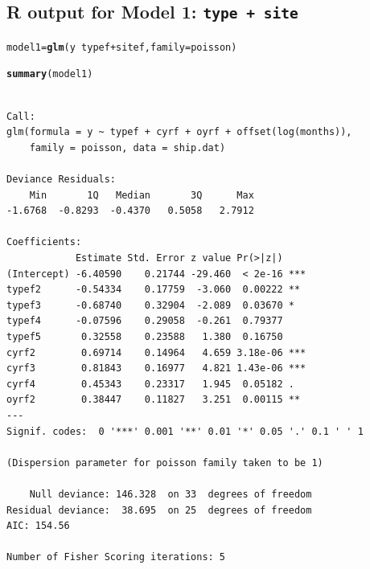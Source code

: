 \documentclass{article}\usepackage[]{graphicx}\usepackage[svgnames]{xcolor}
\makeatletter
\newcommand{\hlopt}[1]{\textcolor[rgb]{0,0,0}{#1}}%
\newcommand{\hlstd}[1]{\textcolor[rgb]{0.345,0.345,0.345}{#1}}%
\newcommand{\hlkwb}[1]{\textcolor[rgb]{0.69,0.353,0.396}{#1}}%
\newcommand{\hlkwc}[1]{\textcolor[rgb]{0.333,0.667,0.333}{#1}}%
\newcommand{\hlkwd}[1]{\textcolor[rgb]{0.737,0.353,0.396}{\textbf{#1}}}%
\newenvironment{kframe}{%
 \def\at@end@of@kframe{}%
 \ifinner\ifhmode%
  \def\at@end@of@kframe{\end{minipage}}%
  \begin{minipage}{\columnwidth}%
 \fi\fi%
 \def\FrameCommand##1{\hskip\@totalleftmargin \hskip-\fboxsep
 \colorbox{shadecolor}{##1}\hskip-\fboxsep
     \hskip-\linewidth \hskip-\@totalleftmargin \hskip\columnwidth}%
 \MakeFramed {\advance\hsize-\width
   \@totalleftmargin\z@ \linewidth\hsize
   \@setminipage}}%
 {\par\unskip\endMakeFramed%
 \at@end@of@kframe}
\newenvironment{knitrout}{}{} %
\makeatother
\begin{document}
\subsection*{R output for Model 1: \texttt{type + site}}
\begin{knitrout}
\color{fgcolor}\begin{kframe}
\begin{alltt}
\hlstd{model1} \hlkwb{=} \hlkwd{glm}\hlstd{(y} \hlopt{~} \hlstd{typef} \hlopt{+} \hlstd{sitef,} \hlkwc{family} \hlstd{= poisson)}
\end{alltt}


{\ttfamily\noindent\bfseries{}}\begin{alltt}
\hlkwd{summary}\hlstd{(model1)}
\end{alltt}
\begin{verbatim}

Call:
glm(formula = y ~ typef + cyrf + oyrf + offset(log(months)), 
    family = poisson, data = ship.dat)

Deviance Residuals: 
    Min       1Q   Median       3Q      Max  
-1.6768  -0.8293  -0.4370   0.5058   2.7912  

Coefficients:
            Estimate Std. Error z value Pr(>|z|)    
(Intercept) -6.40590    0.21744 -29.460  < 2e-16 ***
typef2      -0.54334    0.17759  -3.060  0.00222 ** 
typef3      -0.68740    0.32904  -2.089  0.03670 *  
typef4      -0.07596    0.29058  -0.261  0.79377    
typef5       0.32558    0.23588   1.380  0.16750    
cyrf2        0.69714    0.14964   4.659 3.18e-06 ***
cyrf3        0.81843    0.16977   4.821 1.43e-06 ***
cyrf4        0.45343    0.23317   1.945  0.05182 .  
oyrf2        0.38447    0.11827   3.251  0.00115 ** 
---
Signif. codes:  0 '***' 0.001 '**' 0.01 '*' 0.05 '.' 0.1 ' ' 1

(Dispersion parameter for poisson family taken to be 1)

    Null deviance: 146.328  on 33  degrees of freedom
Residual deviance:  38.695  on 25  degrees of freedom
AIC: 154.56

Number of Fisher Scoring iterations: 5
\end{verbatim}
\end{kframe}
\end{knitrout}
\end{document}
